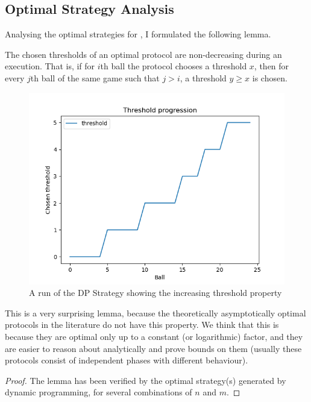 \subsection{Optimal Strategy Analysis}

Analysing the optimal strategies for \TwoThinning, I formulated the following lemma.

\begin{lemma}\label{lemma: two-thinning-increasing-threshold}
The chosen thresholds of an optimal protocol are non-decreasing during an execution. That is, if for $i$th ball the protocol chooses a threshold $x$, then for every $j$th ball of the same game such that $j>i$, a threshold $y\geq x$ is chosen.
\end{lemma}


\begin{figure}[hbt!] \label{dp-increasing-threshold}
    \centering
    \includegraphics[scale=1.0]{Chapter4/Figs/dp_increasing_threshold.png}
    \caption{A run of the DP Strategy showing the increasing threshold property}
\end{figure}

This is a very surprising lemma, because the theoretically asymptotically optimal protocols in the literature do not have this property. We think that this is because they are optimal only up to a constant (or logarithmic) factor, and they are easier to reason about analytically and prove bounds on them (usually these protocols consist of independent phases with different behaviour).


\begin{proof}


The lemma has been verified by the optimal strategy(s) generated by dynamic programming, for several combinations of $n$ and $m$. 
\end{proof}

